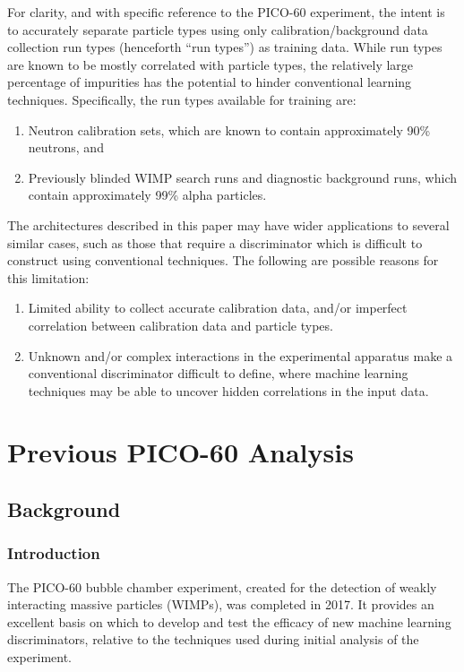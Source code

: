 \documentclass[10pt]{article}
\begin{document}
For clarity, and with specific reference to the PICO-60 experiment, the intent is to accurately separate particle types using only calibration/background data collection run types (henceforth ``run types'') as training data. While run types are known to be mostly correlated with particle types, the relatively large percentage of impurities has the potential to hinder conventional learning techniques. Specifically, the run types available for training are:

\begin{enumerate}
    \item Neutron calibration sets, which are known to contain approximately 90\% neutrons, and
    \item Previously blinded WIMP search runs and diagnostic background runs, which contain approximately 99\% alpha particles.
\end{enumerate}

The architectures described in this paper may have wider applications to several similar cases, such as those that require a discriminator which is difficult to construct using conventional techniques. The following are possible reasons for this limitation:

\begin{enumerate}
    \item Limited ability to collect accurate calibration data, and/or imperfect correlation between calibration data and particle types.
    \item Unknown and/or complex interactions in the experimental apparatus make a conventional discriminator difficult to define, where machine learning techniques may be able to uncover hidden correlations in the input data.
\end{enumerate}

\section{Previous PICO-60 Analysis} \label{previous_analysis}

\subsection{Background}

\subsubsection{Introduction}

The PICO-60 \cite{pico} bubble chamber experiment, created for the detection of weakly interacting massive particles (WIMPs), was completed in 2017. It provides an excellent basis on which to develop and test the efficacy of new machine learning discriminators, relative to the techniques used during initial analysis of the experiment.
\end{document}

